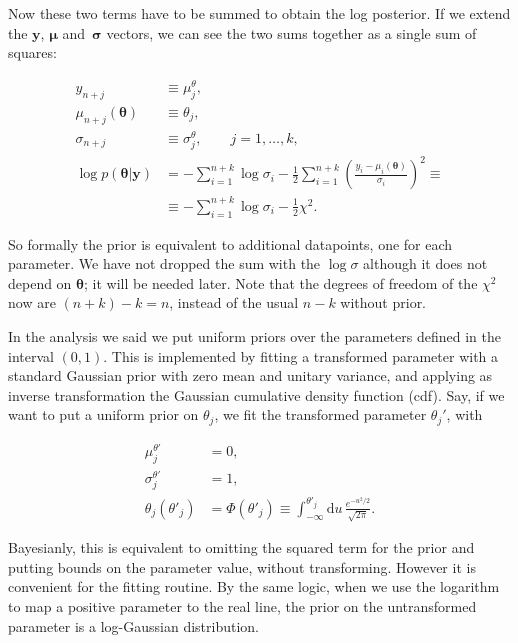 Now these two terms have to be summed to obtain the log posterior. If we extend
the $\mathbf y$, $\boldsymbol\mu$ and~$\boldsymbol\sigma$ vectors, we can see
the two sums together as a single sum of squares:

\begin{align}
    y_{n+j} &\equiv \mu^\theta_j, \\
    \mu_{n+j}(\boldsymbol\theta) &\equiv \theta_j, \\
    \sigma_{n+j} &\equiv \sigma^\theta_j, \qquad j = 1, \ldots, k, \\
    \log p(\boldsymbol\theta|\mathbf y) &=
    -\sum_{i=1}^{n+k} \log\sigma_i
    - \frac 12 \sum_{i=1}^{n+k}
    \left( \frac {y_i - \mu_i(\boldsymbol\theta)} {\sigma_i} \right)^2 \equiv \\
    &\equiv -\sum_{i=1}^{n+k} \log\sigma_i - \frac12 \chi^2.
\end{align}

So formally the prior is equivalent to additional datapoints, one for each
parameter. We have not dropped the sum with the $\log\sigma$ although it does
not depend on $\boldsymbol\theta$; it will be needed later. Note that the
degrees of freedom of the $\chi^2$ now are $(n+k)-k = n$, instead of the usual
$n-k$ without prior.

In the analysis we said we put uniform priors over the parameters defined in
the interval $(0,1)$. This is implemented by fitting a transformed parameter
with a standard Gaussian prior with zero mean and unitary variance, and
applying as inverse transformation the Gaussian cumulative density function
(cdf). Say, if we want to put a uniform prior on $\theta_j$, we fit the
transformed parameter $\theta_j'$, with

\begin{align}
    \mu^{\theta'}_j &= 0, \\
    \sigma^{\theta'}_j &= 1, \\
    \theta_j(\theta'_j) &= \Phi(\theta'_j)
    \equiv \int_{-\infty}^{\theta'_j} \mathrm du\,
    \frac {e^{-u^2/2}} {\sqrt{2\pi}}.
\end{align}

Bayesianly, this is equivalent to omitting the squared term for the prior and
putting bounds on the parameter value, without transforming. However it is
convenient for the fitting routine. By the same logic, when we use the
logarithm to map a positive parameter to the real line, the prior on the
untransformed parameter is a log-Gaussian distribution.


